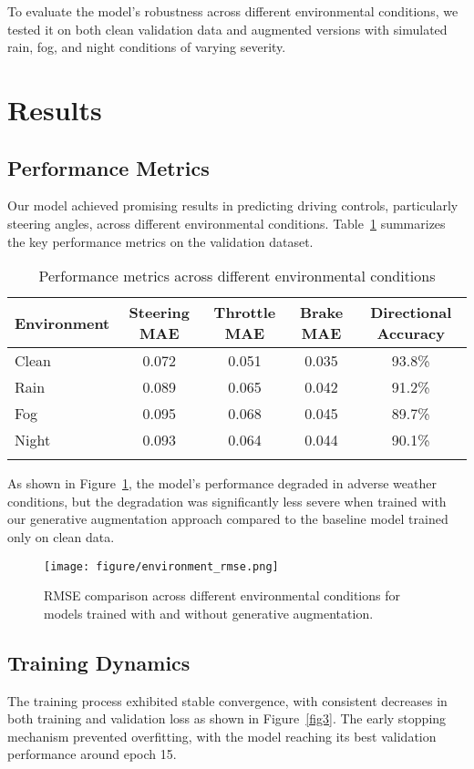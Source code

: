 \documentclass[pdflatex,sn-mathphys-num]{sn-jnl}%
\theoremstyle{thmstyleone}%
\theoremstyle{thmstyletwo}%
\theoremstyle{thmstylethree}%
\begin{document}
To evaluate the model's robustness across different environmental conditions, we tested it on both clean validation data and augmented versions with simulated rain, fog, and night conditions of varying severity.

\section{Results}\label{sec3}

\subsection{Performance Metrics}
Our model achieved promising results in predicting driving controls, particularly steering angles, across different environmental conditions. Table~\ref{tab1} summarizes the key performance metrics on the validation dataset.

\begin{table}[h]
\caption{Performance metrics across different environmental conditions}\label{tab1}%
\begin{tabular}{@{}lcccc@{}}
\toprule
Environment & Steering MAE & Throttle MAE & Brake MAE & Directional Accuracy \\
\midrule
Clean & 0.072 & 0.051 & 0.035 & 93.8\% \\
Rain & 0.089 & 0.065 & 0.042 & 91.2\% \\
Fog & 0.095 & 0.068 & 0.045 & 89.7\% \\
Night & 0.093 & 0.064 & 0.044 & 90.1\% \\
\botrule
\end{tabular}
\end{table}

As shown in Figure~\ref{fig2}, the model's performance degraded in adverse weather conditions, but the degradation was significantly less severe when trained with our generative augmentation approach compared to the baseline model trained only on clean data.

\begin{figure}[h]
\centering
\texttt{[image: figure/environment\_rmse.png]}
\caption{RMSE comparison across different environmental conditions for models trained with and without generative augmentation.}\label{fig2}
\end{figure}

\subsection{Training Dynamics}
The training process exhibited stable convergence, with consistent decreases in both training and validation loss as shown in Figure~\ref{fig3}. The early stopping mechanism prevented overfitting, with the model reaching its best validation performance around epoch 15.
\end{document}
